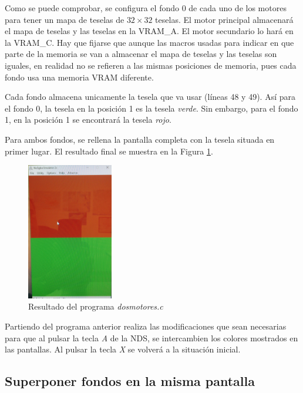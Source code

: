 Como se puede comprobar, se configura el fondo 0 de cada uno de los motores para tener un mapa de teselas de $32\times32$ teselas. El motor principal almacenará el mapa de teselas y las teselas en la VRAM\_A. El motor secundario lo hará en la VRAM\_C. Hay que fijarse que aunque las macros usadas para indicar en que parte de la memoria se van a almacenar el mapa de teselas y las teselas son iguales, en realidad no se refieren a las mismas posiciones de memoria, pues cada fondo usa una memoria VRAM diferente.

Cada fondo almacena unicamente la tesela que va usar (líneas 48 y 49). Así para el fondo 0, la tesela en la posición 1 es la tesela \textit{verde}. Sin embargo, para el fondo 1, en la posición 1 se encontrará la tesela \textit{rojo}. 

Para ambos fondos, se rellena la pantalla completa con la tesela situada en primer lugar. El resultado final se muestra en la Figura \ref{c7_fig:dosmotores}.


\begin{figure}[t]
	\centering
	\includegraphics[height=6cm]{Figuras/C7/c7_dosmotores.jpg}
	\caption{Resultado del programa \textit{dosmotores.c}}
	\label{c7_fig:dosmotores}
\end{figure}


\begin{exercise}
Partiendo del programa anterior realiza las modificaciones que sean necesarias para que al pulsar la tecla \textit{A} de la NDS, se intercambien los colores mostrados en las pantallas. Al pulsar la tecla \textit{X} se volverá a la situación inicial.
\end{exercise}
\subsection{Superponer fondos en la misma pantalla}

